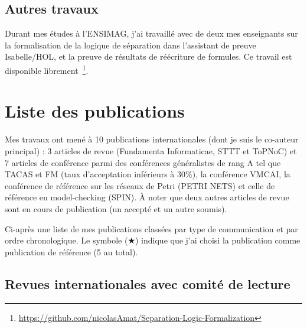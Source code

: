 \vspace{10pt}
\subsection{Autres travaux}
\vspace{10pt}

Durant mes études à l'ENSIMAG, j'ai travaillé avec de deux mes enseignants sur
la formalisation de la logique de séparation dans l'assistant de preuve
Isabelle/HOL, et la preuve de résultats de réécriture de formules. Ce travail
est disponible
librement~\footnote{\url{https://github.com/nicolasAmat/Separation-Logic-Formalization}}.

\vspace{10pt}
\section{Liste des publications}
\label{sec:publications}
\vspace{10pt}

Mes travaux ont mené à 10 publications internationales (dont je suis le
co-auteur principal) : 3 articles de revue (Fundamenta Informaticae, STTT et
ToPNoC) et 7 articles de conférence parmi des conférences généralistes de rang A
tel que TACAS et FM (taux d'acceptation inférieurs à 30\%), la conférence VMCAI,
la conférence de référence sur les réseaux de Petri (PETRI NETS) et celle de
référence en model-checking (SPIN). À noter que deux autres articles de revue
sont en cours de publication (un accepté et un autre soumis).
\medbreak

Ci-après une liste de mes publications classées par type de communication et
par ordre chronologique. Le symbole ($\bigstar$) indique que j'ai choisi la
publication comme publication de référence (5 au total).

\vspace{10pt}
\subsection{Revues internationales avec comité de lecture}
\vspace{10pt}

